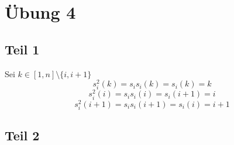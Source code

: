 \documentclass[10pt,a4paper]{article}
\begin{document}
\section*{Übung 4}

\subsection*{Teil 1}

Sei $k \in [1, n] \setminus \{i, i + 1\}$
\begin{equation}
s_{i}^{2}(k) = s_{i}s_{i}(k) = s_{i}(k) = k
\end{equation}
\begin{equation}
s_{i}^{2}(i) = s_{i}s_{i}(i) = s_{i}(i + 1) = i
\end{equation}
\begin{equation}
s_{i}^{2}(i + 1) = s_{i}s_{i}(i + 1) = s_{i}(i) = i + 1
\end{equation}

\subsection*{Teil 2}
\end{document}
